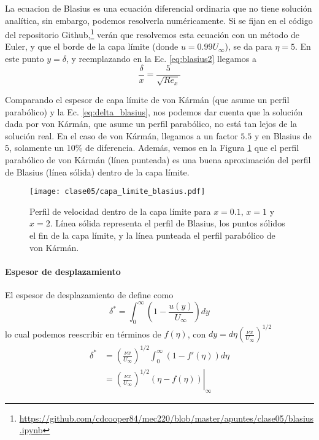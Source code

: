  La ecuacion de Blasius es una ecuación diferencial ordinaria que no tiene solución analítica, sin embargo, podemos resolverla numéricamente.
 Si se fijan en el código del repositorio Github,\footnote{\url{https://github.com/cdcooper84/mec220/blob/master/apuntes/clase05/blasius.ipynb}} verán  que resolvemos esta ecuación con un método de Euler, y que el borde de la capa límite (donde $u=0.99U_\infty$), se da para $\eta=5$.
En este punto $y=\delta$, y reemplazando en la Ec. \eqref{eq:blasius2} llegamos a
%
\begin{equation}\label{eq:delta_blasius}
\frac{\delta}{x} = \frac{5}{\sqrt{Re_x}}
\end{equation}

Comparando el espesor de capa límite de von Kármán (que asume un perfil parabólico) y la Ec. \eqref{eq:delta_blasius}, nos podemos dar cuenta que la solución dada por von Kármán, que asume un perfil parabólico, no está tan lejos de la solución real.
En el caso de von Kármán, llegamos a un factor $5.5$ y en Blasius de $5$, solamente un 10\% de diferencia.
Además, vemos en la Figura \ref{fig:capa_limite_blasius} que el perfil parabólico de von Kármán (línea punteada) es una buena aproximación del perfil de Blasius (línea sólida) dentro de la capa límite.
%
\begin{figure}
\centering
\texttt{[image: clase05/capa\_limite\_blasius.pdf]}
\caption{Perfil de velocidad dentro de la capa límite para $x=0.1$, $x=1$ y $x=2$. Línea sólida representa el perfil de Blasius, los puntos sólidos el fin de la capa límite, y la línea punteada el perfil parabólico de von Kármán.}
\label{fig:capa_limite_blasius}
\end{figure}

\paragraph*{Espesor de desplazamiento}

El espesor de desplazamiento de define como 
%
\begin{equation}
\delta^* = \int_0^\infty\left(1-\frac{u(y)}{U_\infty}\right)dy
\end{equation}
%
lo cual podemos reescribir en términos de $f(\eta)$, con $dy = d\eta\left(\frac{\nu x}{U_\infty}\right)^{1/2}$
%
\begin{align}
\delta^* &= \left(\frac{\nu x}{U_\infty}\right)^{1/2}\int_0^\infty(1-f'(\eta))d\eta\\
& = \left.\left(\frac{\nu x}{U_\infty}\right)^{1/2} (\eta-f(\eta))\right|_\infty
\end{align}


